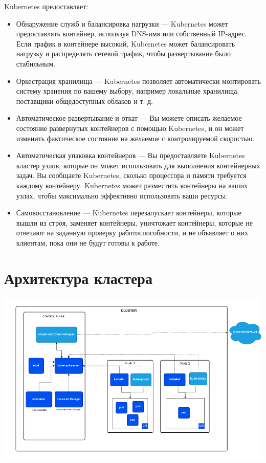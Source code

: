 \documentclass[a4page]{article}
\begin{document}
Kubernetes предоставляет:
\begin{itemize}
  \item Обнаружение служб и балансировка нагрузки --- Kubernetes может предоставлять контейнер, используя DNS-имя или собственный IP-адрес. Если трафик в контейнере высокий, Kubernetes может балансировать нагрузку и распределять сетевой трафик, чтобы развертывание было стабильным.
  \item Оркестрация хранилища --- Kubernetes позволяет автоматически монтировать систему хранения по вашему выбору, например локальные хранилища, поставщики общедоступных облаков и т.
д.
\item Автоматическое развертывание и откат --- Вы можете описать желаемое состояние развернутых контейнеров с помощью Kubernetes, и он может изменить фактическое состояние на желаемое с контролируемой скоростью.
\item Автоматическая упаковка контейнеров --- Вы предоставляете Kubernetes кластер узлов, которые он может использовать для выполнения контейнерных задач. Вы сообщаете Kubernetes, сколько процессора и памяти требуется каждому контейнеру. Kubernetes может разместить контейнеры на ваших узлах, чтобы максимально эффективно использовать ваши ресурсы.
\item Самовосстановление --- Kubernetes перезапускает контейнеры, которые вышли из строя, заменяет контейнеры, уничтожает контейнеры, которые не отвечают на заданную проверку работоспособности, и не объявляет о них клиентам, пока они не будут готовы к работе.
\end{itemize}

\section{Архитектура кластера}
\includegraphics[width=450pt]{cluster-architecture.png}
\end{document}
